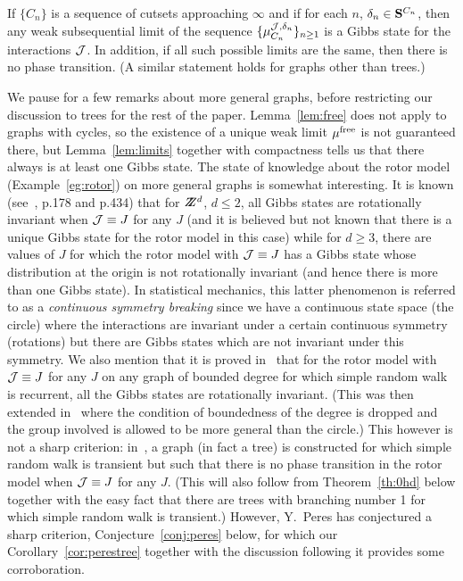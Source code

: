 \begin{lem} \label{lem:limits}
If $\{C_n\}$ is a sequence of cutsets approaching $\infty$ and if for each
$n$, $\delta_n\in \S^{C_n}$, then any weak subsequential limit of the sequence 
$\{\mu_{C_n}^{\J,\delta_n}\}_{n\ge 1}$
is a Gibbs state for the interactions $\J$. 
In addition, if all such possible limits are the same,
then there is no phase transition.  (A similar statement holds for 
graphs other than trees.)
\end{lem}

We pause for a few remarks about more general graphs, before restricting
our discussion to trees for the rest of the paper.  Lemma~\ref{lem:free}
does not apply to graphs with cycles, so the existence of a unique
weak limit $\mufree$ is not guaranteed there, but Lemma~\ref{lem:limits}
together with compactness tells us that there always is at least one Gibbs
state.  The state of knowledge about the rotor model (Example~\ref{eg:rotor}) 
on more general graphs is somewhat interesting.  It is known 
(see~\cite{Ge}, p.178 and p.434)
that for $\Z^d$, $d \leq 2$, all Gibbs states are rotationally invariant
when $\J\equiv J$ for any $J$ 
(and it is believed but not known that there is a unique Gibbs state for the 
rotor model in this case) while for $d \geq 3$, there are values of $J$ 
for which the rotor model with $\J\equiv J$ has a Gibbs state whose
distribution at the origin is not
rotationally invariant (and hence there is 
more than one Gibbs state). In statistical mechanics,
this latter phenomenon is referred to as a {\it continuous 
symmetry breaking} since we have a continuous state space (the circle) where
the interactions are invariant under a certain continuous symmetry 
(rotations) but there are Gibbs states which are not invariant under this 
symmetry.  We also mention that it is proved in~\cite{C} that 
for the rotor model with $\J\equiv J$ for any $J$ 
on any graph of bounded degree  
for which simple random walk is recurrent, all
the Gibbs states are rotationally invariant. (This was then extended
in~\cite{MW} where the condition of boundedness of the degree is dropped
and the group involved is allowed to be more general than the circle.)
This however is not a sharp criterion: in~\cite{E}, 
a graph (in fact a tree) is constructed for which simple random walk 
is transient but such that there is no phase transition in the 
rotor model when $\J\equiv J$ for any $J$. (This will also follow from
Theorem~\ref{th:0hd} below together with the easy fact that
there are trees with branching number 1 for which
simple random walk is transient.)
However, Y.\ Peres has conjectured a sharp criterion,
Conjecture~\ref{conj:peres} below, for which our Corollary~\ref{cor:perestree} 
together with the discussion following it provides some corroboration. 

